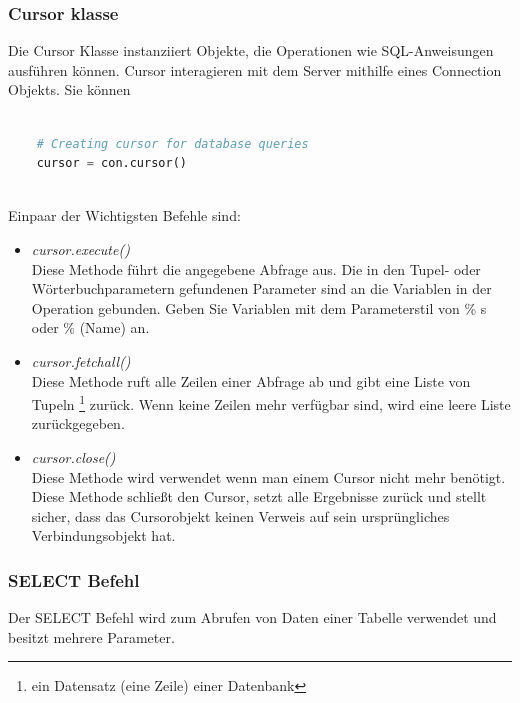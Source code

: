 \newpage

\subsubsection{Cursor klasse}

Die Cursor Klasse instanziiert Objekte, die Operationen wie SQL-Anweisungen ausführen können. Cursor interagieren mit dem Server mithilfe eines Connection Objekts. Sie können 

\begin{lstlisting}[language=Python, caption={Erstellen eines Cusorobjekts},captionpos=b]
	
	# Creating cursor for database queries
	cursor = con.cursor()
	
\end{lstlisting}

Einpaar der Wichtigsten Befehle sind:

\begin{itemize}
	
	\item \textit{cursor.execute()} \\ Diese Methode führt die angegebene Abfrage aus. Die in den Tupel- oder Wörterbuchparametern gefundenen Parameter sind an die Variablen in der Operation gebunden. Geben Sie Variablen mit dem Parameterstil von \% s oder \% (Name) an.
	
	\item \textit{cursor.fetchall()} \\ Diese Methode ruft alle Zeilen einer Abfrage ab und gibt eine Liste von Tupeln \footnote{ein Datensatz (eine Zeile) einer Datenbank} zurück. Wenn keine Zeilen mehr verfügbar sind, wird eine leere Liste zurückgegeben.
	
	\item \textit{cursor.close()} \\ Diese Methode wird verwendet wenn man einem Cursor nicht mehr benötigt. Diese Methode schließt den Cursor, setzt alle Ergebnisse zurück und stellt sicher, dass das Cursorobjekt keinen Verweis auf sein ursprüngliches Verbindungsobjekt hat.
	
\end{itemize}

\subsubsection{SELECT Befehl}

Der SELECT Befehl wird zum Abrufen von Daten einer Tabelle verwendet und besitzt mehrere Parameter.

